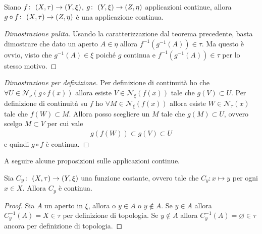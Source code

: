 \begin{theorem}
	Siano $f \colon\ (X, \tau) \rightarrow (Y, \xi)$, $g \colon\ (Y,\xi) \rightarrow (Z, \eta)$ applicazioni continue, allora $g \circ f \colon\ (X,\tau) \rightarrow (Z,\eta)$ è una applicazione continua.
\end{theorem}
\begin{proof}[Dimostrazione pulita]
	Usando la caratterizzazione dal teorema precedente, basta dimostrare che dato un aperto $A \in \eta$ allora $f^{-1}(g^{-1}(A)) \in \tau$. Ma questo è ovvio, visto che $g^{-1}(A) \in \xi$ poiché $g$ continua e $f^{-1}(g^{-1}(A)) \in \tau$ per lo stesso motivo.  
\end{proof}
\begin{proof}[Dimostrazione per definizione]
	Per definizione di continuità ho che $\forall U \in \mathcal{N}_\nu(g \circ f (x))$ allora esiste $V \in \mathcal{N}_\xi(f(x))$ tale che $g(V) \subset U$. Per definizione di continuità su $f$ ho $\forall M \in \mathcal{N}_\xi(f (x))$ allora esiste $W \in \mathcal{N}_\tau(x)$ tale che $f(W) \subset M$. Allora posso scegliere un $M$ tale che $g(M) \subset U$, ovvero scelgo $M \subset V$ per cui vale 
	\begin{equation}
	\begin{aligned}
		g(f(W)) \subset g(V) \subset U
	\end{aligned}
	\end{equation}
	e quindi $g \circ f$ è continua.
\end{proof}

A seguire alcune proposizioni sulle applicazioni continue.

\begin{theorem}
	Sia $C_y \colon\ (X,\tau) \rightarrow (Y,\xi)$ una funzione costante, ovvero tale che $C_y : x \mapsto y$ per ogni $x \in X$. Allora $C_y$ è continua.
\end{theorem}
\begin{proof}
	Sia $A$ un aperto in $\xi$, allora o $y \in A$ o $y \notin A$. Se $y \in A$ allora $C^{-1}_y(A) = X \in \tau$ per definizione di topologia. Se $y \notin A$ allora $C^{-1}_y(A) = \varnothing \in \tau$ ancora per definizione di topologia.
\end{proof}

